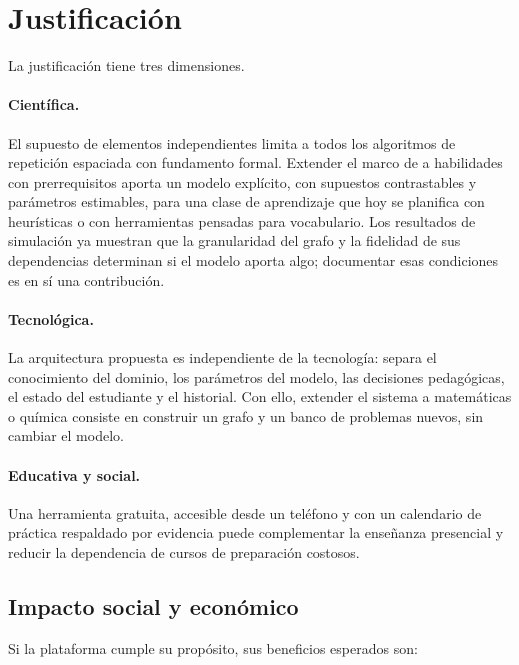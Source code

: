 \documentclass[12pt]{article}
\theoremstyle{definition}
\begin{document}
\section{Justificación}
\label{sec:justificacion}

La justificación tiene tres dimensiones.

\paragraph{Científica.} El supuesto de elementos independientes limita a todos los algoritmos de repetición espaciada con fundamento formal. Extender el marco de \citet{tabibian2019} a habilidades con prerrequisitos aporta un modelo explícito, con supuestos contrastables y parámetros estimables, para una clase de aprendizaje que hoy se planifica con heurísticas o con herramientas pensadas para vocabulario. Los resultados de simulación ya muestran que la granularidad del grafo y la fidelidad de sus dependencias determinan si el modelo aporta algo; documentar esas condiciones es en sí una contribución.

\paragraph{Tecnológica.} La arquitectura propuesta es independiente de la tecnología: separa el conocimiento del dominio, los parámetros del modelo, las decisiones pedagógicas, el estado del estudiante y el historial. Con ello, extender el sistema a matemáticas o química consiste en construir un grafo y un banco de problemas nuevos, sin cambiar el modelo.

\paragraph{Educativa y social.} Una herramienta gratuita, accesible desde un teléfono y con un calendario de práctica respaldado por evidencia puede complementar la enseñanza presencial y reducir la dependencia de cursos de preparación costosos.

\subsection{Impacto social y económico}

Si la plataforma cumple su propósito, sus beneficios esperados son:
\end{document}
